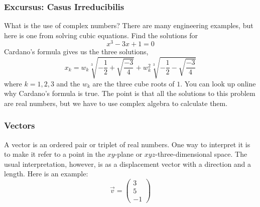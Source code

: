 \documentclass[xcolor=dvipsnames]{beamer}
\begin{document}
\begin{frame}
  \frametitle{Excursus: Casus Irreducibilis}
  What is the use of complex numbers? There are many engineering
  examples, but here is one from solving cubic equations. Find the
  solutions for
  \begin{equation}
    \label{eq:oozaechi}
    x^{3}-3x+1=0
  \end{equation}
  Cardano's formula gives us the three solutions,
  \begin{equation}
    \label{eq:iejopice}
    x_{k}=w_{k}\sqrt[3]{-\frac{1}{2}+\sqrt{\frac{-3}{4}}}+w_{k}^{2}\sqrt[3]{-\frac{1}{2}-\sqrt{\frac{-3}{4}}}
  \end{equation}
where $k=1,2,3$ and the $w_{k}$ are the three cube roots of $1$. You
can look up online why Cardano's formula is true. The point is that
all the solutions to this problem are real numbers, but we have to use
complex algebra to calculate them. 
\end{frame}

\begin{frame}
  \frametitle{Vectors}
  A vector is an ordered pair or triplet of real numbers. One way to interpret it
  is to make it refer to a point in the $xy$-plane or
  $xyz$-three-dimensional space. The usual interpretation, however, is
  as a \alert{displacement vector} with a direction and a length. Here
  is an example:
  \begin{equation}
    \label{eq:lapheeka}
    \vec{v}=\left(
    \begin{array}{c}
      3 \\
      5 \\
      -1
    \end{array}\right)
  \end{equation}
\end{frame}
\end{document}
